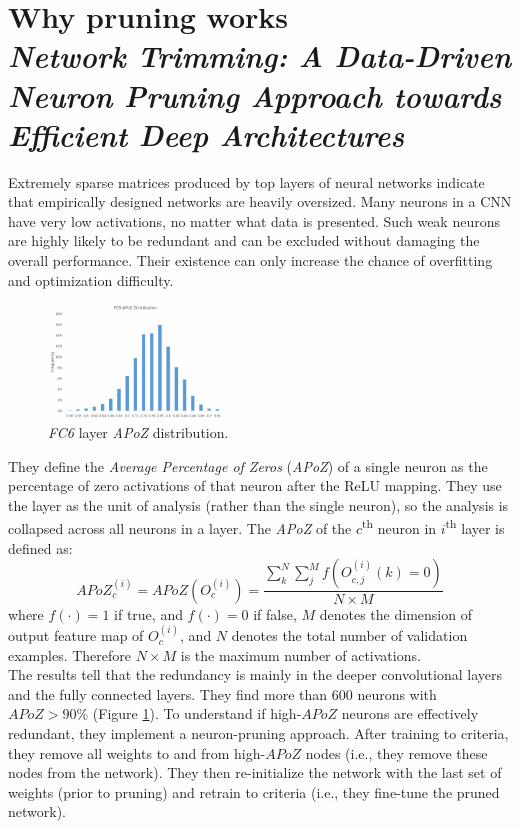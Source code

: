 \section[Why pruning works]{Why pruning works\\ \textit{Network Trimming: A Data-Driven Neuron Pruning Approach towards Efficient Deep Architectures}\\ }
Extremely sparse matrices produced by top layers of neural networks indicate that empirically designed networks are heavily oversized. Many neurons in a CNN have very low activations, no matter what data is presented. Such weak neurons are highly likely to be redundant and can be excluded without damaging the overall performance. Their existence can only increase the chance of overfitting and optimization difficulty.

\begin{figure}
  \centering
  \includegraphics[width=0.41\textwidth]{images/apoz.png}
  \caption{\textit{FC6} layer \textit{APoZ} distribution.}
  \label{fig:apoz}
\end{figure}

They define the \textit{Average Percentage of Zeros} (\textit{APoZ}) of a single neuron as the percentage of zero activations of that neuron after the ReLU mapping. They use the layer as the unit of analysis (rather than the single neuron), so the analysis is collapsed across all neurons in a layer. The \textit{APoZ} of the $c$\textsuperscript{th} neuron in $i$\textsuperscript{th} layer is defined as:
\[
APoZ_c^{(i)} = APoZ(O_c^{(i)}) = \frac{\sum_k^N \sum_j^M f(O_{c,j}^{(i)}(k)=0)}{N\times M}
\]
where $f(\cdot) = 1$ if true, and $f(\cdot) = 0$ if false, $M$ denotes the dimension of output feature map of $O_c^{(i)}$, and $N$ denotes the total number of validation examples. Therefore $N\times M$ is the maximum number of activations.\\

The results tell that the redundancy is mainly in the deeper convolutional layers and the fully connected layers. They find more than 600 neurons with $APoZ > 90\%$ (Figure \ref{fig:apoz}).
To understand if high-$APoZ$ neurons are effectively redundant, they implement a neuron-pruning approach. After training to criteria, they remove all weights to and from high-$APoZ$ nodes (i.e., they remove these nodes from the network). They then re-initialize the network with the last set of weights (prior to pruning) and retrain to criteria (i.e., they fine-tune the pruned network).

